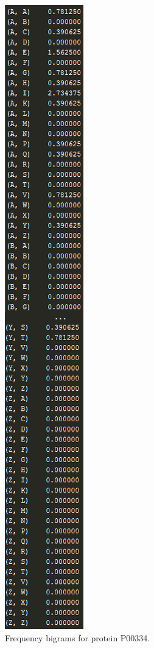 \documentclass[a4paper, 10pt, conference]{ieeeconf}      %
\begin{document}
\begin{figure}[thpb]
	\centering
	\includegraphics[scale=0.6]{1.png}
	\caption{Frequency bigrams for protein P00334.}
	\label{big}
\end{figure}
\end{document}
